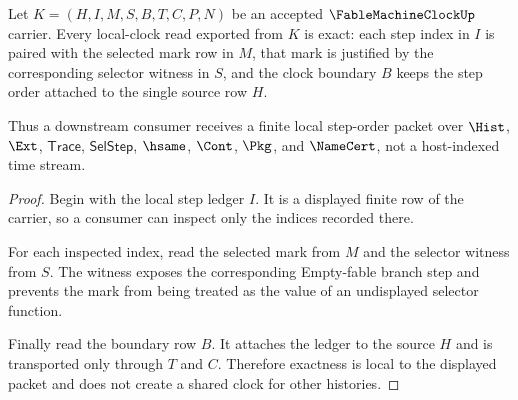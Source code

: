 \begin{theorem}
\label{thm:fable-machine-clock-step-ledger-exactness}
Let $K=(H,I,M,S,B,T,C,P,N)$ be an accepted $\FableMachineClockUp$ carrier. Every local-clock read exported from $K$ is exact: each step index in $I$ is paired with the selected mark row in $M$, that mark is justified by the corresponding selector witness in $S$, and the clock boundary $B$ keeps the step order attached to the single source row $H$.

Thus a downstream consumer receives a finite local step-order packet over $\Hist$, $\Ext$, $\mathsf{Trace}$, $\mathsf{SelStep}$, $\hsame$, $\Cont$, $\Pkg$, and $\NameCert$, not a host-indexed time stream.
\end{theorem}
\begin{proof}
Begin with the local step ledger $I$. It is a displayed finite row of the carrier, so a consumer can inspect only the indices recorded there.

For each inspected index, read the selected mark from $M$ and the selector witness from $S$. The witness exposes the corresponding Empty-fable branch step and prevents the mark from being treated as the value of an undisplayed selector function.

Finally read the boundary row $B$. It attaches the ledger to the source $H$ and is transported only through $T$ and $C$. Therefore exactness is local to the displayed packet and does not create a shared clock for other histories.
\end{proof}

